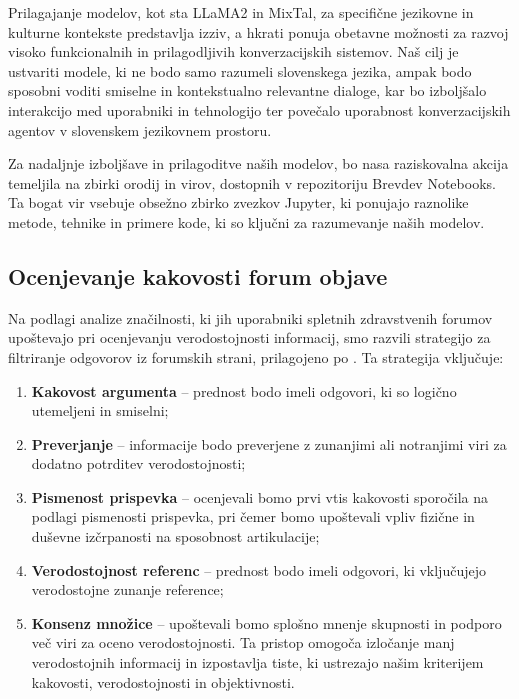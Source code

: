 \documentclass[fleqn,moreauthors,10pt]{ds_report}
\begin{document}
Prilagajanje modelov, kot sta LLaMA2 in MixTal, za specifične jezikovne in kulturne kontekste predstavlja izziv, a hkrati ponuja obetavne možnosti za razvoj visoko funkcionalnih in prilagodljivih konverzacijskih sistemov. Naš cilj je ustvariti modele, ki ne bodo samo razumeli slovenskega jezika, ampak bodo sposobni voditi smiselne in kontekstualno relevantne dialoge, kar bo izboljšalo interakcijo med uporabniki in tehnologijo ter povečalo uporabnost konverzacijskih agentov v slovenskem jezikovnem prostoru.

Za nadaljnje izboljšave in prilagoditve naših modelov, bo nasa raziskovalna akcija temeljila na zbirki orodij in virov, dostopnih v repozitoriju Brevdev Notebooks. Ta bogat vir vsebuje obsežno zbirko zvezkov Jupyter, ki ponujajo raznolike metode, tehnike in primere kode, ki so ključni za razumevanje naših modelov.

\subsection*{Ocenjevanje kakovosti forum objave}

Na podlagi analize značilnosti, ki jih uporabniki spletnih zdravstvenih forumov upoštevajo pri ocenjevanju verodostojnosti informacij, smo razvili strategijo za filtriranje odgovorov iz forumskih strani, prilagojeno po \cite{fan2013online, sauls2018perceived}. Ta strategija vključuje:
\begin{enumerate}
    \item \textbf{Kakovost argumenta} -- prednost bodo imeli odgovori, ki so logično utemeljeni in smiselni;
    \item \textbf{Preverjanje} -- informacije bodo preverjene z zunanjimi ali notranjimi viri za dodatno potrditev verodostojnosti;
    \item \textbf{Pismenost prispevka} -- ocenjevali bomo prvi vtis kakovosti sporočila na podlagi pismenosti prispevka, pri čemer bomo upoštevali vpliv fizične in duševne izčrpanosti na sposobnost artikulacije;
    \item  \textbf{Verodostojnost referenc} -- prednost bodo imeli odgovori, ki vključujejo verodostojne zunanje reference; 
    \item \textbf{Konsenz množice} -- upoštevali bomo splošno mnenje skupnosti in podporo več viri za oceno verodostojnosti. Ta pristop omogoča izločanje manj verodostojnih informacij in izpostavlja tiste, ki ustrezajo našim kriterijem kakovosti, verodostojnosti in objektivnosti.
\end{enumerate}
\end{document}

